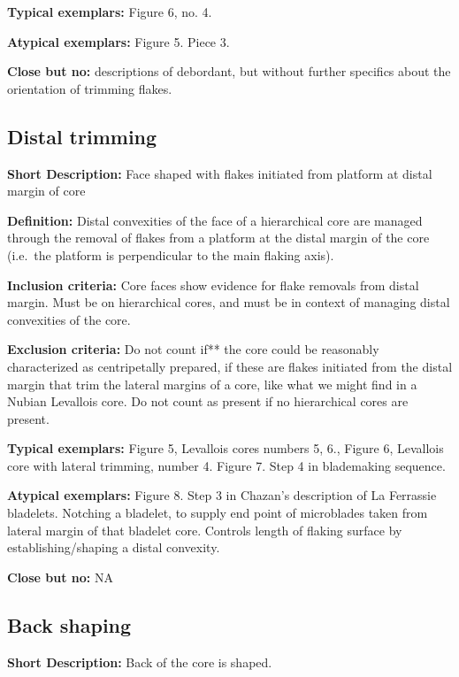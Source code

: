 \documentclass[
]{article}
\begin{document}
\textbf{Typical exemplars:} Figure 6, no. 4.

\textbf{Atypical exemplars:} Figure 5. Piece 3.

\textbf{Close but no:} descriptions of debordant, but without further
specifics about the orientation of trimming flakes.

\hypertarget{distal-trimming}{%
\subsection{Distal trimming}\label{distal-trimming}}

\textbf{Short Description:} Face shaped with flakes initiated from
platform at distal margin of core

\textbf{Definition:} Distal convexities of the face of a hierarchical
core are managed through the removal of flakes from a platform at the
distal margin of the core (i.e.~the platform is perpendicular to the
main flaking axis).

\textbf{Inclusion criteria:} Core faces show evidence for flake removals
from distal margin. Must be on hierarchical cores, and must be in
context of managing distal convexities of the core.

\textbf{Exclusion criteria:} Do not count if** the core could be
reasonably characterized as centripetally prepared, if these are flakes
initiated from the distal margin that trim the lateral margins of a
core, like what we might find in a Nubian Levallois core. Do not count
as present if no hierarchical cores are present.

\textbf{Typical exemplars:} Figure 5, Levallois cores numbers 5, 6.,
Figure 6, Levallois core with lateral trimming, number 4. Figure 7. Step
4 in blademaking sequence.

\textbf{Atypical exemplars:} Figure 8. Step 3 in Chazan's description of
La Ferrassie bladelets. Notching a bladelet, to supply end point of
microblades taken from lateral margin of that bladelet core. Controls
length of flaking surface by establishing/shaping a distal convexity.

\textbf{Close but no:} NA

\hypertarget{back-shaping}{%
\subsection{Back shaping}\label{back-shaping}}

\textbf{Short Description:} Back of the core is shaped.
\end{document}

